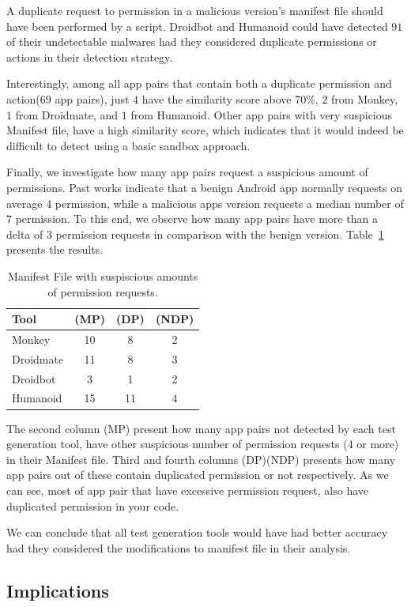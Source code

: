 A duplicate request to permission in a malicious version's manifest file should have been performed by a script.  Droidbot and Humanoid could have detected $91$ of their undetectable malwares had they considered duplicate permissions or actions in their detection strategy.  

Interestingly, among all app pairs  that contain both a duplicate permission and action(69 app pairs), just $4$ have the similarity score above 70\%, $2$ from Monkey, $1$ from Droidmate, and $1$ from Humanoid. Other app pairs with very suspicious Manifest file, have a high similarity score, which indicates that it would indeed be difficult to detect using a basic sandbox approach. 

Finally, we investigate how many app pairs request a suspicious amount of permissions. Past works indicate that a benign Android app normally requests on average $4$ permission, while a malicious apps version requests a median number of $7$ permission\cite{DBLP:conf/soups/FeltHEHCW12}\cite{DBLP:journals/tifs/0029LBKTLC17}. To this end, we observe how many app pairs have more than a delta of $3$ permission requests in comparison with the benign version. Table~\ref{tab:mp} presents the results.

\begin{table}[ht]
  \caption{Manifest File with suspiscious amounts of permission requests.}
  \centering
  \begin{small}
 \begin{tabular}{lccc}
   \toprule
   Tool & (MP) & (DP) & (NDP) \\   \midrule
   Monkey &  10 & 8 & 2 \\ 
   Droidmate &  11 & 8 & 3 \\ 
   Droidbot &  3 & 1 & 2 \\ 
   Humanoid &  15 & 11 & 4 \\ 
 \bottomrule
 \end{tabular}
 \end{small}
 \label{tab:mp}
\end{table}

The second column (MP) present how many app pairs not detected by each test generation tool, have other suspicious number of permission requests ($4$ or more) in their Manifest file. Third and fourth columns (DP)(NDP) presents how many app pairs out of these contain duplicated permission or not respectively. As we can see, most of app pair that have excessive permission request, also have duplicated permission in your code. 


\begin{obs}{3}{}
 We can conclude that all test generation tools  would have had better accuracy had they considered the modifications to manifest file in their analysis. 
\end{obs}

\subsection{Implications}\label{sec:implications}